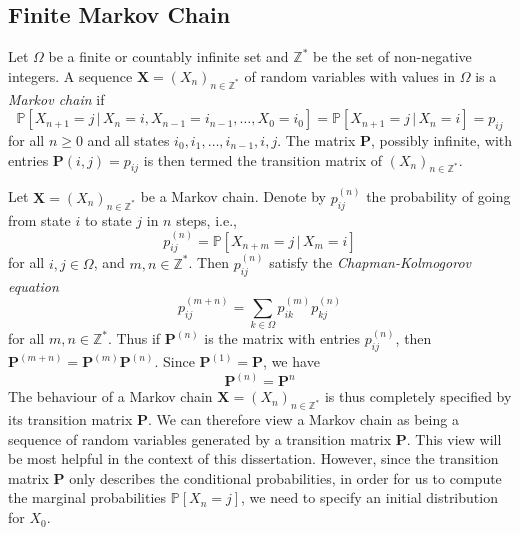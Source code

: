 \subsection{Finite Markov Chain}
\begin{definition}
  \label{def:6}
  Let $\Omega$ be a finite or countably infinite set and
  $\mathbb{Z}^{*}$ be the set of non-negative integers. A sequence
  $\mathbf{X} = (X_n)_{n \in \mathbb{Z}^{*}}$ of random variables with values in
  $\Omega$ is a {\em Markov chain} if
  \begin{equation}
    \label{eq:8}
    \mathbb{P}[X_{n+1} = j \, | \, X_n = i, X_{n-1} = i_{n-1},
    \dots, X_0 = i_0] = \mathbb{P}[X_{n+1} = j \, | \, X_n = i] =
    p_{ij}
  \end{equation}
  for all $n \geq 0$ and all states $i_0, i_1, \dots, i_{n-1}, i,
  j$. The matrix $\mathbf{P}$, possibly infinite, with entries
  $\mathbf{P}(i,j) = p_{ij}$ is then termed the transition matrix of
  $(X_n)_{n \in \mathbb{Z}^*}$.
\end{definition}
Let $\mathbf{X} = (X_n)_{n \in \mathbb{Z}^*}$ be a Markov
chain. Denote by $p_{ij}^{(n)}$ the probability of going from state
$i$ to state $j$ in $n$ steps, i.e.,
\begin{equation}
  \label{eq:11}
  p_{ij}^{(n)} = \mathbb{P}[ X_{n + m } = j \, | \, X_m = i]
\end{equation}
for all $i, j \in \Omega$, and $m,n \in \mathbb{Z}^{*}$. Then
$p_{ij}^{(n)}$ satisfy the {\em Chapman-Kolmogorov equation}
\begin{equation}
  \label{eq:12}
  p_{ij}^{(m+n)} = \sum_{k \in \Omega}{p_{ik}^{(m)}p_{kj}^{(n)}}
\end{equation}
for all $m,n \in \mathbb{Z}^{*}$. Thus if $\mathbf{P}^{(n)}$ is the
matrix with entries $p_{ij}^{(n)}$, then $\mathbf{P}^{(m+n)} =
\mathbf{P}^{(m)}\mathbf{P}^{(n)}$. Since $\mathbf{P}^{(1)} =
\mathbf{P}$, we have
\begin{equation}
  \label{eq:13}
  \mathbf{P}^{(n)} = \mathbf{P}^{n}
\end{equation}
The behaviour of a Markov chain $\mathbf{X} = (X_n)_{n \in
  \mathbb{Z}^{*}}$ is thus completely specified by its transition
matrix $\mathbf{P}$. We can therefore view a Markov chain as being a
sequence of random variables generated by a transition matrix
$\mathbf{P}$. This view will be most helpful in the context of this
dissertation. However, since the transition matrix $\mathbf{P}$ only describes
the conditional probabilities, in order for us to compute the marginal
probabilities $\mathbb{P}[X_n = j]$, we need to specify an initial
distribution for $X_0$.


